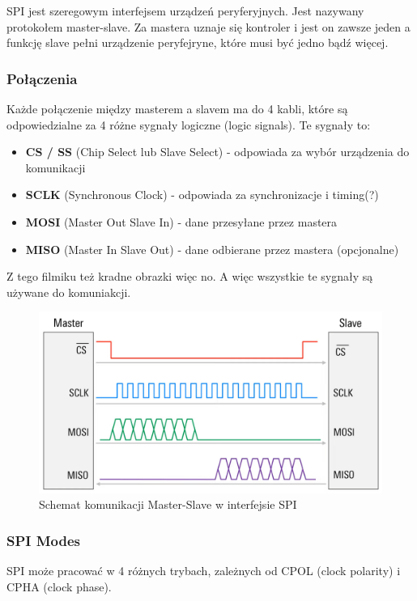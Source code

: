 \documentclass[11pt]{article}
\begin{document}
SPI jest szeregowym interfejsem urządzeń peryferyjnych. Jest nazywany
protokołem master-slave. Za mastera uznaje się kontroler i jest on zawsze
jeden a funkcję slave pełni urządzenie peryfejryne, które musi być jedno bądź więcej.
\subsubsection{Połączenia}
Każde połączenie między masterem a slavem ma do 4 kabli, które są odpowiedzialne
za 4 różne sygnały logiczne (logic signals). Te sygnały to:
\begin{itemize}
    \item {
        \textbf{CS / SS} (Chip Select lub Slave Select) - odpowiada za wybór 
        urządzenia do komunikacji
    }
    \item {
        \textbf{SCLK} (Synchronous Clock) - odpowiada za synchronizacje i timing(?)
    }
    \item {
        \textbf{MOSI} (Master Out Slave In) - dane przesyłane
        przez mastera
    }
    \item {
        \textbf{MISO} (Master In Slave Out) - dane odbierane przez
        mastera (opcjonalne)
    }
\end{itemize}
Z tego filmiku też kradne obrazki więc no. A więc wszystkie te sygnały są używane do komuniakcji.
\begin{figure}[H]
    \includegraphics[width=\textwidth]{SPI_communication.png}
    \caption{Schemat komunikacji Master-Slave w interfejsie SPI}
\end{figure}
\subsubsection{SPI Modes}
SPI może pracować w 4 różnych trybach, zależnych od CPOL (clock polarity) i
CPHA (clock phase).
\end{document}
